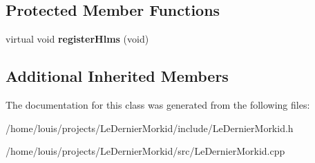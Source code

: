 \subsection*{Protected Member Functions}
\begin{DoxyCompactItemize}
\item 
\mbox{\label{class_le_dernier_morkid_graphics_system_a3956ef81965b84ec80e1069050cf9c44}} 
virtual void {\bfseries register\+Hlms} (void)
\end{DoxyCompactItemize}
\subsection*{Additional Inherited Members}


The documentation for this class was generated from the following files\+:\begin{DoxyCompactItemize}
\item 
/home/louis/projects/\+Le\+Dernier\+Morkid/include/Le\+Dernier\+Morkid.\+h\item 
/home/louis/projects/\+Le\+Dernier\+Morkid/src/Le\+Dernier\+Morkid.\+cpp\end{DoxyCompactItemize}
